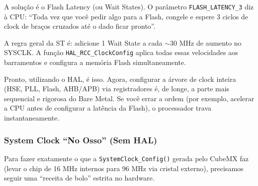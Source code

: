 \documentclass[12pt,a4paper]{article}
\begin{document}
A solução é o Flash Latency (ou Wait States). O parâmetro \texttt{FLASH\_LATENCY\_3} diz à CPU: ``Toda vez que você pedir algo para a Flash, congele e espere 3 ciclos de clock de braços cruzados até o dado ficar pronto''. 

A regra geral da ST é: adicione 1 Wait State a cada $\sim$30 MHz de aumento no SYSCLK. A função \texttt{HAL\_RCC\_ClockConfig} aplica todas essas velocidades aos barramentos e configura a memória Flash simultaneamente.

Pronto, utilizando o HAL, é isso. Agora, configurar a árvore de clock inteira (HSE, PLL, Flash, AHB/APB) via registradores é, de longe, a parte mais sequencial e rigorosa do Bare Metal. Se você errar a ordem (por exemplo, acelerar a CPU antes de configurar a latência da Flash), o processador trava instantaneamente.

\subsubsection{System Clock ``No Osso'' (Sem HAL)}

Para fazer exatamente o que a \texttt{SystemClock\_Config()} gerada pelo CubeMX faz (levar o chip de 16 MHz internos para 96 MHz via cristal externo), precisamos seguir uma ``receita de bolo'' estrita no hardware.
\end{document}

